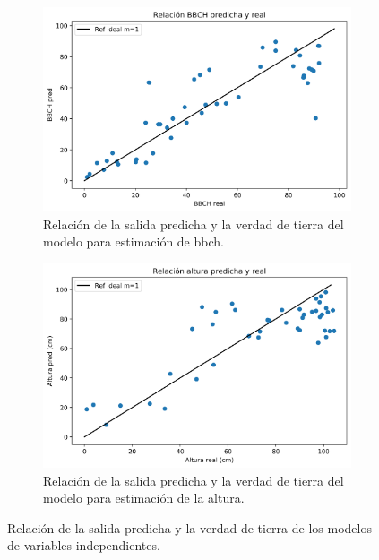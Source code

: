 \begin{figure}[H]
\centering
\begin{subfigure}{0.8\textwidth}
\includegraphics[width=0.95\linewidth]{archivos/tfg/Mean/TEST_PARC_RECTA}
\caption{Relación de la salida predicha y la verdad de tierra del modelo para estimación de \gls{bbch}.\label{fig:rel_b}}
\end{subfigure}
\begin{subfigure}{.8\textwidth}
\includegraphics[width=0.95\linewidth]{archivos/tfg/Mean/TEST_PARC_RECTA_H}
\caption{Relación de la salida predicha y la verdad de tierra del modelo para estimación de la altura. \label{fig:rel_h}}
\end{subfigure}
\caption{Relación de la salida predicha y la verdad de tierra de los modelos de variables independientes. \label{fig:rel}}
\end{figure}

